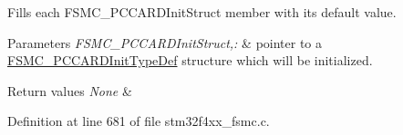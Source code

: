 Fills each F\-S\-M\-C\-\_\-\-P\-C\-C\-A\-R\-D\-Init\-Struct member with its default value. 


\begin{DoxyParams}{Parameters}
{\em F\-S\-M\-C\-\_\-\-P\-C\-C\-A\-R\-D\-Init\-Struct,\-:} & pointer to a \hyperlink{struct_f_s_m_c___p_c_c_a_r_d_init_type_def}{F\-S\-M\-C\-\_\-\-P\-C\-C\-A\-R\-D\-Init\-Type\-Def} structure which will be initialized. \\
\hline
\end{DoxyParams}

\begin{DoxyRetVals}{Return values}
{\em None} & \\
\hline
\end{DoxyRetVals}


Definition at line 681 of file stm32f4xx\-\_\-fsmc.\-c.

